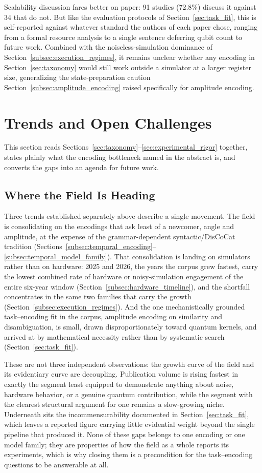 \documentclass{ieeeaccess}
\begin{document}
Scalability discussion fares better on paper: 91 studies (72.8\%) discuss it against 34 that do not. But like the evaluation protocols of Section~\ref{sec:task_fit}, this is self-reported against whatever standard the authors of each paper chose, ranging from a formal resource analysis to a single sentence deferring qubit count to future work. Combined with the noiseless-simulation dominance of Section~\ref{subsec:execution_regimes}, it remains unclear whether any encoding in Section~\ref{sec:taxonomy} would still work outside a simulator at a larger register size, generalizing the state-preparation caution Section~\ref{subsec:amplitude_encoding} raised specifically for amplitude encoding.

\section{Trends and Open Challenges}
\label{sec:trends_challenges}

This section reads Sections~\ref{sec:taxonomy}--\ref{sec:experimental_rigor} together, states plainly what the encoding bottleneck named in the abstract is, and converts the gaps into an agenda for future work.

\subsection{Where the Field Is Heading}

Three trends established separately above describe a single movement. The field is consolidating on the encodings that ask least of a newcomer, angle and amplitude, at the expense of the grammar-dependent syntactic/DisCoCat tradition (Sections~\ref{subsec:temporal_encoding}--\ref{subsec:temporal_model_family}). That consolidation is landing on simulators rather than on hardware: 2025 and 2026, the years the corpus grew fastest, carry the lowest combined rate of hardware or noisy-simulation engagement of the entire six-year window (Section~\ref{subsec:hardware_timeline}), and the shortfall concentrates in the same two families that carry the growth (Section~\ref{subsec:execution_regimes}). And the one mechanistically grounded task--encoding fit in the corpus, amplitude encoding on similarity and disambiguation, is small, drawn disproportionately toward quantum kernels, and arrived at by mathematical necessity rather than by systematic search (Section~\ref{sec:task_fit}).

These are not three independent observations: the growth curve of the field and its evidentiary curve are decoupling. Publication volume is rising fastest in exactly the segment least equipped to demonstrate anything about noise, hardware behavior, or a genuine quantum contribution, while the segment with the clearest structural argument for one remains a slow-growing niche. Underneath sits the incommensurability documented in Section~\ref{sec:task_fit}, which leaves a reported figure carrying little evidential weight beyond the single pipeline that produced it. None of these gaps belongs to one encoding or one model family; they are properties of how the field as a whole reports its experiments, which is why closing them is a precondition for the task--encoding questions to be answerable at all.
\end{document}

